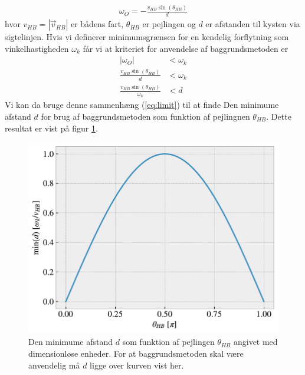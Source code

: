 \documentclass[%
 reprint,
nofootinbib,
aps,
]{revtex4-1}
\begin{document}
 \begin{align*}
   \omega_O = -\frac{v_{HB}\sin{(\theta_{HB})}}{d}
 \end{align*}
 hvor $v_{HB} = |\vec{v}_{HB}|$ er bådens fart, $\theta_{HB}$ er pejlingen og $d$ er afstanden til kysten via sigtelinjen. Hvis vi definerer minimumsgrænsen for en kendelig forflytning som vinkelhastigheden $\omega_k$ får vi at kriteriet for anvendelse af baggrundsmetoden er
 \begin{align}
   |\omega_O| &< \omega_k \nonumber \\
   \frac{v_{HB}\sin{(\theta_{HB})}}{d} &< \omega_k \nonumber \\
   \frac{v_{HB}\sin{(\theta_{HB})}}{\omega_k} &< d
   \label{eq:limit}
 \end{align}
Vi kan da bruge denne sammenhæng  (\ref{eq:limit}) til at finde Den minimume afstand $d$ for brug af baggrundsmetoden som funktion af pejlingnen $\theta_{HB}$. Dette resultat er vist på figur \ref{fig:limit_dimensionless}.
 \begin{figure}[H]
   \includegraphics[width=\linewidth]{figures/limit_dimensionless.pdf}
   \caption{Den minimume afstand $d$ som funktion af pejlingen $\theta_{HB}$ angivet med dimensionløse enheder. For at baggrundsmetoden skal være anvendelig må $d$ ligge over kurven vist her.}
   \label{fig:limit_dimensionless}
 \end{figure}
\end{document}
